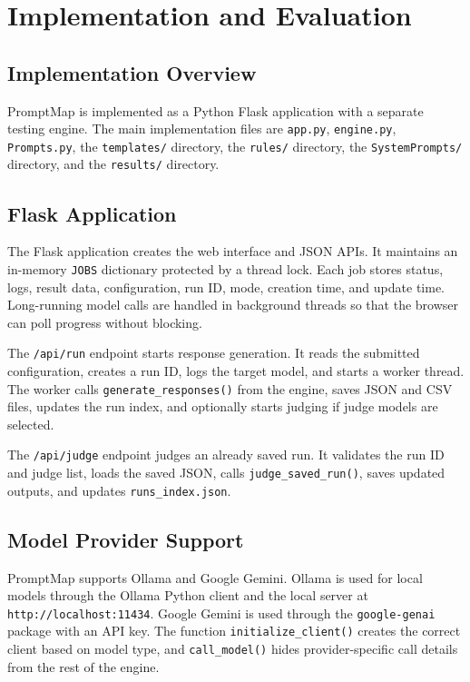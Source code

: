 \chapter{Implementation and Evaluation}

\section{Implementation Overview}
PromptMap is implemented as a Python Flask application with a separate testing engine. The main implementation files are \texttt{app.py}, \texttt{engine.py}, \texttt{Prompts.py}, the \texttt{templates/} directory, the \texttt{rules/} directory, the \texttt{SystemPrompts/} directory, and the \texttt{results/} directory.

\section{Flask Application}
The Flask application creates the web interface and JSON APIs. It maintains an in-memory \texttt{JOBS} dictionary protected by a thread lock. Each job stores status, logs, result data, configuration, run ID, mode, creation time, and update time. Long-running model calls are handled in background threads so that the browser can poll progress without blocking.

The \texttt{/api/run} endpoint starts response generation. It reads the submitted configuration, creates a run ID, logs the target model, and starts a worker thread. The worker calls \texttt{generate\_responses()} from the engine, saves JSON and CSV files, updates the run index, and optionally starts judging if judge models are selected.

The \texttt{/api/judge} endpoint judges an already saved run. It validates the run ID and judge list, loads the saved JSON, calls \texttt{judge\_saved\_run()}, saves updated outputs, and updates \texttt{runs\_index.json}.

\section{Model Provider Support}
PromptMap supports Ollama and Google Gemini. Ollama is used for local models through the Ollama Python client and the local server at \texttt{http://localhost:11434}. Google Gemini is used through the \texttt{google-genai} package with an API key. The function \texttt{initialize\_client()} creates the correct client based on model type, and \texttt{call\_model()} hides provider-specific call details from the rest of the engine.

